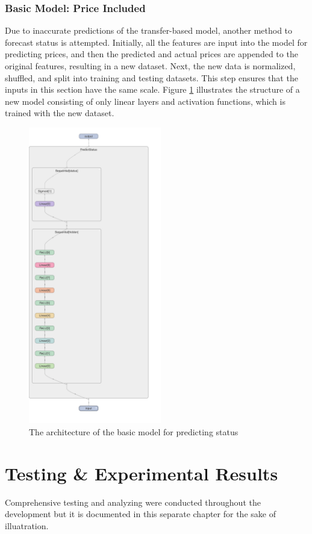 \documentclass[12pt,twoside]{report}
\begin{document}
\subsection{Basic Model: Price Included}
\label{basic_status_include}
Due to inaccurate predictions of the transfer-based model, another method to forecast status is attempted. Initially, all the features are input into the model for predicting prices, and then the predicted and actual prices are appended to the original features, resulting in a new dataset. Next, the new data is normalized, shuffled, and split into training and testing datasets. This step ensures that the inputs in this section have the same scale. Figure \ref{basic_status_layout} illustrates the structure of a new model consisting of only linear layers and activation functions, which is trained with the new dataset.

\begin{figure}[!htbp]
	\centering
	\includegraphics[height=13cm]{basic_status_layout}
	\caption{The architecture of the basic model for predicting status}
	\label{basic_status_layout}
\end{figure}

\chapter{Testing \& Experimental Results}
Comprehensive testing and analyzing were conducted throughout the development but it is documented in this separate chapter for the sake of illuatration. 
\end{document}
